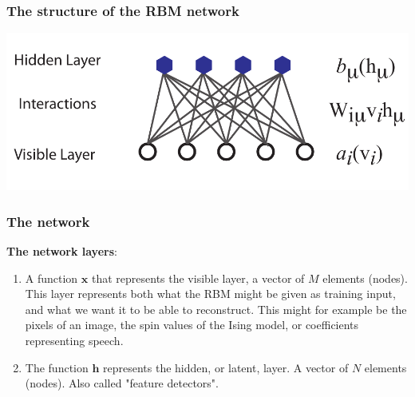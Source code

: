\documentclass{beamer}
\begin{document}
\begin{frame}
\frametitle{The structure of the RBM network}

\vspace{6mm}

\centerline{\includegraphics[width=1.0\linewidth]{figures/RBM.pdf}}

\vspace{6mm}
\end{frame}

\begin{frame}
\frametitle{The network}

\textbf{The network layers}:
\begin{enumerate}
 \item A function $\mathbf{x}$ that represents the visible layer, a vector of $M$ elements (nodes). This layer represents both what the RBM might be given as training input, and what we want it to be able to reconstruct. This might for example be the pixels of an image, the spin values of the Ising model, or coefficients representing speech.

 \item The function $\mathbf{h}$ represents the hidden, or latent, layer. A vector of $N$ elements (nodes). Also called "feature detectors".
\end{enumerate}

\noindent
\end{frame}
\end{document}
